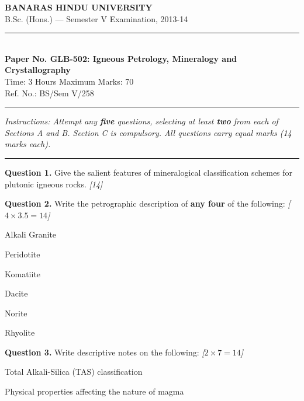 \documentclass[11pt,a4paper]{article}
\newcommand{\pts}[1]{\hfill   \textit{[#1]}}
\begin{document}
\begin{center}
  {\large\bfseries BANARAS HINDU UNIVERSITY}\\[2pt]
  {\normalsize B.Sc. (Hons.) --- Semester V Examination, 2013-14}\\[6pt]
  \rule{0.8\linewidth}{0.5pt}\\[6pt]
  {\large\bfseries Paper No. GLB-502: Igneous Petrology, Mineralogy and Crystallography}\\[4pt]
  {\normalsize Time: 3 Hours \hfill Maximum Marks: 70}\\[2pt]
  {\small Ref. No.: BS/Sem V/258}
\end{center}
\rule{\linewidth}{0.4pt}
\smallskip



\noindent   \textit{Instructions: Attempt any   \textbf{five} questions, selecting at least   \textbf{two} from each of Sections A and B. Section C is compulsory. All questions carry equal marks (14 marks each).}
\bigskip

\bigskip


\rule{\linewidth}{0.4pt}\smallskip




\noindent   \textbf{Question 1.} Give the salient features of mineralogical classification schemes for plutonic igneous rocks. \pts{14}

\medskip


\noindent   \textbf{Question 2.} Write the petrographic description of   \textbf{any four} of the following: \pts{$4  \times 3.5 = 14$}

\begin{parts}
  \item Alkali Granite
  \item Peridotite
  \item Komatiite
  \item Dacite
  \item Norite
  \item Rhyolite
\end{parts}

\medskip


\noindent   \textbf{Question 3.} Write descriptive notes on the following: \pts{$2  \times 7 = 14$}

\begin{parts}
  \item Total Alkali-Silica (TAS) classification
  \item Physical properties affecting the nature of magma
\end{parts}
\end{document}
